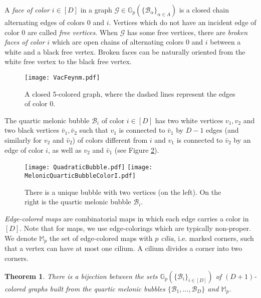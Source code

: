 \documentclass[aps,prd,10pt,notitlepage,nofootinbib,superscriptaddress,showkeys,showpacs]{revtex4-1}
\newtheorem{theorem}{Theorem}
\begin{document}
A \emph{face of color $i\in [D]$} in a graph ${\mathcal{G}}\in {\mathbb{G}}_p(\{{\mathcal{B}}_\alpha\}_{\alpha\in A})$ is a closed chain alternating edges of colors 0 and $i$. Vertices which do not have an incident edge of color 0 are called \emph{free vertices}. When ${\mathcal{G}}$ has some free vertices, there are \emph{broken faces of color $i$} which are open chains of alternating colors 0 and $i$ between a white and a black free vertex. Broken faces can be naturally oriented from the white free vertex to the black free vertex.

\begin{figure}
\texttt{[image: VacFeynm.pdf]}
\caption{\label{fig:VacFeynm} A closed 5-colored graph, where the dashed lines represent the edges of color 0.}
\end{figure}

The quartic melonic bubble ${\mathcal{B}}_i$ of color $i\in[D]$ has two white vertices $v_1, v_2$ and two black vertices $\bar{v}_1, \bar{v}_2$ such that $v_1$ is connected to $\bar{v}_1$ by $D-1$ edges (and similarly for $v_2$ and $\bar{v}_2$) of colors different from $i$ and $v_1$ is connected to $\bar{v}_2$ by an edge of color $i$, as well as $v_2$ and $\bar{v}_1$ (see Figure \ref{fig:BubbleExamples}).

\begin{figure}
\texttt{[image: QuadraticBubble.pdf]} \hspace{2cm} \texttt{[image: MelonicQuarticBubbleColorI.pdf]}
\caption{\label{fig:BubbleExamples} There is a unique bubble with two vertices (on the left). On the right is the quartic melonic bubble ${\mathcal{B}}_i$.}
\end{figure}

\emph{Edge-colored maps} are combinatorial maps in which each edge carries a color in $[D]$. Note that for maps, we use edge-colorings which are typically non-proper. We denote ${\mathbb{M}}_p$ the set of edge-colored maps with $p$ \emph{cilia}, i.e. marked corners, such that a vertex can have at most one cilium. A cilium divides a corner into two corners.

\begin{theorem} \label{thm:QuarticMelonicBijection}
There is a bijection between the sets ${\mathbb{G}}_p(\{{\mathcal{B}}_i\}_{i\in [D]})$ of $(D+1)$-colored graphs built from the quartic melonic bubbles $\{{\mathcal{B}}_1, \dotsc, {\mathcal{B}}_D\}$ and ${\mathbb{M}}_p$.
\end{theorem}
\end{document}
